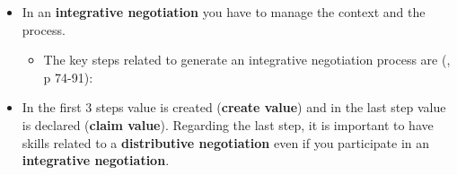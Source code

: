 \documentclass[
  ignorenonframetext,
]{beamer}
\providecommand{\tightlist}{%
  \setlength{\itemsep}{0pt}\setlength{\parskip}{0pt}}\usepackage{longtable,booktabs,array}
\begin{document}
\begin{frame}{}
\label{section-12}
\begin{itemize}
\item
  In an \textbf{integrative negotiation} you have to manage the context
  and the process.

  \begin{itemize}
  \item
    The key steps related to generate an integrative negotiation process
    are (, p 74-91):

  \end{itemize}
\item
  In the first 3 steps value is created (\textbf{create value}) and in
  the last step value is declared (\textbf{claim value}). Regarding the
  last step, it is important to have skills related to a
  \textbf{distributive negotiation} even if you participate in an
  \textbf{integrative negotiation}.
\end{itemize}
\end{frame}
\end{document}
